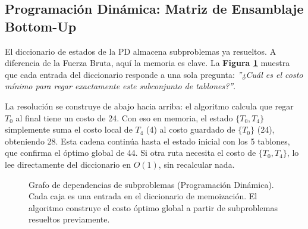 \documentclass[conference, a4paper]{IEEEtran}
\begin{document}
\subsection{Programación Dinámica: Matriz de Ensamblaje Bottom-Up}
El diccionario de estados de la PD almacena subproblemas ya resueltos. A diferencia de la Fuerza Bruta, aquí la memoria es clave. La \textbf{Figura \ref{fig:pd_graph}} muestra que cada entrada del diccionario responde a una sola pregunta: \textit{''¿Cuál es el costo mínimo para regar exactamente este subconjunto de tablones?''}.

La resolución se construye de abajo hacia arriba: el algoritmo calcula que regar $T_0$ al final tiene un costo de 24. Con eso en memoria, el estado $\{T_0, T_4\}$ simplemente suma el costo local de $T_4$ (4) al costo guardado de $\{T_0\}$ (24), obteniendo 28. Esta cadena continúa hasta el estado inicial con los 5 tablones, que confirma el óptimo global de 44. Si otra ruta necesita el costo de $\{T_0, T_4\}$, lo lee directamente del diccionario en $O(1)$, sin recalcular nada.

\begin{figure}[htbp]
\centering
{}
\caption{Grafo de dependencias de subproblemas (Programación Dinámica). Cada caja es una entrada en el diccionario de memoización. El algoritmo construye el costo óptimo global a partir de subproblemas resueltos previamente.}
\label{fig:pd_graph}
\end{figure}
\end{document}
